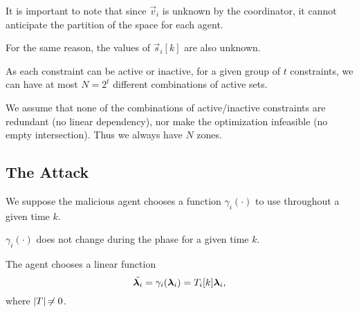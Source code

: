 \documentclass{ifacconf}  %
\begin{document}
\begin{challenge}\label{ch:zone_unknown}
  It is important to note that since $\vec{v}_{i}$ is unknown by the coordinator, it cannot anticipate the partition of the space for each agent.
\end{challenge}
\begin{challenge}\label{ch:s_unknown}
 For the same reason, the values of $\vec{s}_{i}[k]$ are also unknown.
\end{challenge}

 As each constraint can be active or inactive, for a given group of $t$ constraints, we can have at most $N=2^{t}$ different combinations of active sets.

 \begin{assumption}
   We assume that none of the combinations of active/inactive constraints are redundant (no linear dependency), nor make the optimization infeasible (no empty intersection).
   Thus we always have $N$ zones.
 \end{assumption}



\subsection{The Attack}\label{ssec:attack}
We suppose the malicious agent chooses a function $\gamma_{i}(\cdot)$ to use throughout a given time $k$.
\begin{assumption}
  $\gamma_{i}(\cdot)$ does not change during the \negotiation{} phase for a given time $k$.
\end{assumption}

\begin{assumption}
  The agent chooses a linear function
  \begin{equation}
\tilde{\lambdai}=\gamma_{i}(\vec{\lambda}_{i})=\Tik\vec{\lambda}_{i},
\end{equation}
  where $|T|\not\nobreak\mkern -2mu = 0$.
\end{assumption}
\end{document}
